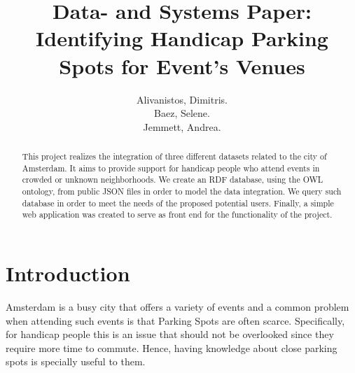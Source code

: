 \documentclass[runningheads,a4paper]{../../StyleFiles/llncs}
\begin{document}
\mainmatter  %

\title{Data- and Systems Paper: Identifying Handicap Parking Spots for Event's Venues}


%
%
\author{Alivanistos, Dimitris. \\ Baez, Selene. \\ Jemmett, Andrea. }
%


\maketitle


\begin{abstract}
	This project realizes the integration of three different datasets related to the city of Amsterdam. It aims to provide support for handicap people who attend events in crowded or unknown neighborhoods.
	We create an RDF database, using the OWL ontology, from public JSON files in order to model the data integration. We query such database in order to meet the needs of the proposed potential users. Finally, a simple web application was created to serve as front end for the functionality of the project. 
\end{abstract}


\section{Introduction}
Amsterdam is a busy city that offers a variety of events and a common problem when attending such events is that Parking Spots are often scarce. Specifically, for handicap people this is an issue that should not be overlooked since they require more time to commute. Hence, having knowledge about close parking spots is specially useful to them. 
\end{document}

